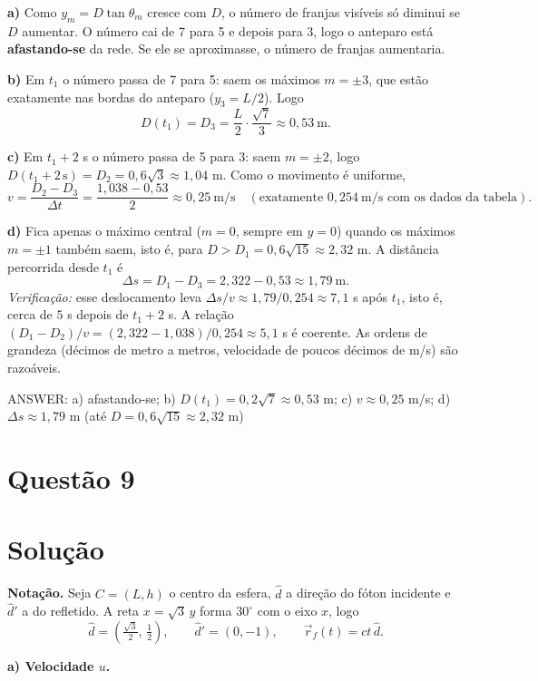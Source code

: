 \documentclass{article}%
\begin{document}
\textbf{a)} Como $y_m=D\tan\theta_m$ cresce com $D$, o número de franjas visíveis só diminui se $D$ aumentar. O número cai de 7 para 5 e depois para 3, logo o anteparo está \textbf{afastando-se} da rede. Se ele se aproximasse, o número de franjas aumentaria.

\textbf{b)} Em $t_1$ o número passa de 7 para 5: saem os máximos $m=\pm3$, que estão exatamente nas bordas do anteparo ($y_3=L/2$). Logo
\[
D(t_1)=D_3=\frac{L}{2}\cdot\frac{\sqrt7}{3}\approx 0{,}53\ \text{m}.
\]

\textbf{c)} Em $t_1+2$ s o número passa de 5 para 3: saem $m=\pm2$, logo $D(t_1+2\,\text{s})=D_2=0{,}6\sqrt3\approx1{,}04$ m. Como o movimento é uniforme,
\[
v=\frac{D_2-D_3}{\Delta t}=\frac{1{,}038-0{,}53}{2}\approx 0{,}25\ \text{m/s}\quad(\text{exatamente } 0{,}254\ \text{m/s com os dados da tabela}).
\]

\textbf{d)} Fica apenas o máximo central ($m=0$, sempre em $y=0$) quando os máximos $m=\pm1$ também saem, isto é, para $D>D_1=0{,}6\sqrt{15}\approx2{,}32$ m. A distância percorrida desde $t_1$ é
\[
\Delta s=D_1-D_3=2{,}322-0{,}53\approx1{,}79\ \text{m}.
\]
\textit{Verificação:} esse deslocamento leva $\Delta s/v\approx1{,}79/0{,}254\approx7{,}1$ s após $t_1$, isto é, cerca de $5$ s depois de $t_1+2$ s. A relação $(D_1-D_2)/v=(2{,}322-1{,}038)/0{,}254\approx5{,}1$ s é coerente. As ordens de grandeza (décimos de metro a metros, velocidade de poucos décimos de m/s) são razoáveis.

\medskip
ANSWER: a) afastando-se; b) $D(t_1)=0{,}2\sqrt7\approx0{,}53$ m; c) $v\approx0{,}25$ m/s; d) $\Delta s\approx1{,}79$ m (até $D=0{,}6\sqrt{15}\approx2{,}32$ m)%
\newpage%
\section*{Questão 9}

\section*{Solução}

\textbf{Notação.} Seja $C=(L,h)$ o centro da esfera, $\hat d$ a direção do fóton incidente e $\hat d'$ a do refletido. A reta $x=\sqrt3\,y$ forma $30^\circ$ com o eixo $x$, logo
\[
\hat d=\left(\tfrac{\sqrt3}{2},\,\tfrac12\right),\qquad \hat d'=(0,-1),\qquad \vec r_f(t)=ct\,\hat d .
\]

\textbf{a) Velocidade $u$.}
\end{document}

